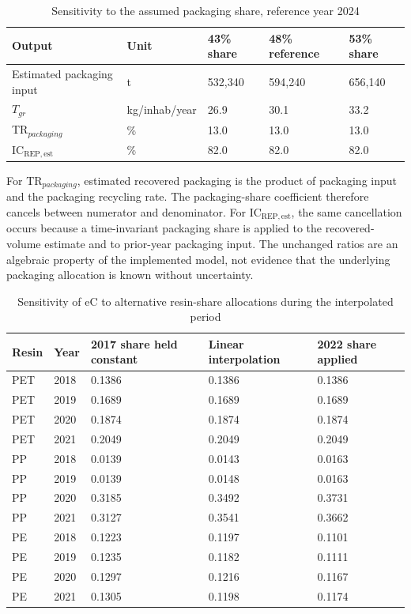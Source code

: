 \documentclass[review,10pt]{elsarticle}
\begin{document}
\begin{longtable}{|L{3.0cm}|L{2.0cm}|L{3.2cm}|L{3.2cm}|L{3.2cm}|}
\caption{Sensitivity to the assumed packaging share, reference year 2024}
\label{tab:s_packaging_sensitivity}\\
\hline
\textbf{Output} & \textbf{Unit} & \textbf{43\% share} & \textbf{48\% reference} & \textbf{53\% share} \\
\hline
\endfirsthead
\hline
Estimated packaging input & t & 532,340 & 594,240 & 656,140 \\
\hline
$T_{gr}$ & kg/inhab/year & 26.9 & 30.1 & 33.2 \\
\hline
TR$_{packaging}$ & \% & 13.0 & 13.0 & 13.0 \\
\hline
IC$_{\mathrm{REP,est}}$ & \% & 82.0 & 82.0 & 82.0 \\
\hline
\end{longtable}

For TR$_{packaging}$, estimated recovered packaging is the product of packaging input and the packaging recycling rate. The packaging-share coefficient therefore cancels between numerator and denominator. For IC$_{\mathrm{REP,est}}$, the same cancellation occurs because a time-invariant packaging share is applied to the recovered-volume estimate and to prior-year packaging input. The unchanged ratios are an algebraic property of the implemented model, not evidence that the underlying packaging allocation is known without uncertainty.

\begin{longtable}{|L{1.5cm}|L{1.6cm}|L{3.4cm}|L{3.4cm}|L{3.4cm}|}
\caption{Sensitivity of eC to alternative resin-share allocations during the interpolated period}
\label{tab:s_ec_sensitivity}\\
\hline
\textbf{Resin} & \textbf{Year} & \textbf{2017 share held constant} & \textbf{Linear interpolation} & \textbf{2022 share applied} \\
\hline
\endfirsthead
\hline
PET & 2018 & 0.1386 & 0.1386 & 0.1386 \\
PET & 2019 & 0.1689 & 0.1689 & 0.1689 \\
PET & 2020 & 0.1874 & 0.1874 & 0.1874 \\
PET & 2021 & 0.2049 & 0.2049 & 0.2049 \\
\hline
PP & 2018 & 0.0139 & 0.0143 & 0.0163 \\
PP & 2019 & 0.0139 & 0.0148 & 0.0163 \\
PP & 2020 & 0.3185 & 0.3492 & 0.3731 \\
PP & 2021 & 0.3127 & 0.3541 & 0.3662 \\
\hline
PE & 2018 & 0.1223 & 0.1197 & 0.1101 \\
PE & 2019 & 0.1235 & 0.1182 & 0.1111 \\
PE & 2020 & 0.1297 & 0.1216 & 0.1167 \\
PE & 2021 & 0.1305 & 0.1198 & 0.1174 \\
\hline
\end{longtable}
\end{document}
